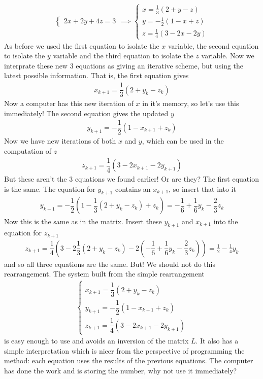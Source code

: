 {\begin{align*}
\begin{cases}
2x + 2y + 4z = 3
\end{cases}
\implies
\begin{cases}
x= \frac{1}{3}\left(2 + y - z \right) \\
y = -\frac{1}{2}\left(1 - x + z \right)\\
z = \frac{1}{4}\left(3 - 2x - 2y \right)
\end{cases}
\end{align*}
As before we used the first equation to isolate the $x$ variable, the second equation to isolate the $y$ variable and the third equation to isolate the $z$ variable. Now we interprate these new 3 equations as giving an iterative scheme, but using the latest possible information. That is, the first equation gives
\begin{align*}
x_{k+1}= \dfrac{1}{3}\left(2 + y_k - z_k \right)
\end{align*}
Now a computer has this new iteration of $x$ in it's memory, so let's use this immediately! The second equation gives the updated $y$
\begin{align*}
y_{k+1} = -\dfrac{1}{2}\left(1 - x_{k+1} + z_k \right)
\end{align*}
Now we have new iterations of both $x$ and $y$, which can be used in the computation of $z$
\begin{align*}
z_{k+1} = \dfrac{1}{4}\left(3 - 2x_{k+1} - 2y_{k+1} \right)
\end{align*}
But these aren't the 3 equations we found earlier! Or are they? The first equation is the same. The equation for $y_{k+1}$ contains an $x_{k+1}$, so insert that into it
\begin{align*}
y_{k+1} = -\dfrac{1}{2}\left(1 - \dfrac{1}{3}\left(2 + y_k - z_k \right) + z_k \right)= -\dfrac{1}{6} +  \dfrac{1}{6}y_k - \dfrac{2}{3}z_k
\end{align*}
Now this is the same as in the matrix. Insert these $y_{k+1}$ and $x_{k+1}$ into the equation for $z_{k+1}$
\begin{align*}
z_{k+1} = \dfrac{1}{4}\left(3 - 2\dfrac{1}{3}\left(2 + y_k - z_k \right) - 2\left(-\dfrac{1}{6} +  \dfrac{1}{6}y_k - \dfrac{2}{3}z_k\right) \right) = \frac{1}{2} - \frac{1}{4} y_k
\end{align*}
and so all three equations are the same. But! We should not do this rearrangement. The system built from the simple rearrangement
\begin{align*}
\begin{cases}
x_{k+1} = \dfrac{1}{3}\left(2 + y_k - z_k \right) \\
y_{k+1} = -\dfrac{1}{2}\left(1 - x_{k+1} + z_k \right) \\
z_{k+1} = \dfrac{1}{4}\left(3 - 2x_{k+1} - 2y_{k+1} \right)
\end{cases}
\end{align*}
is easy enough to use and avoids an inversion of the matrix $L$. It also has a simple interpretation which is nicer from the perspective of programming the method: each equation uses the results of the previous equations. The computer has done the work and is storing the number, why not use it immediately?

}
